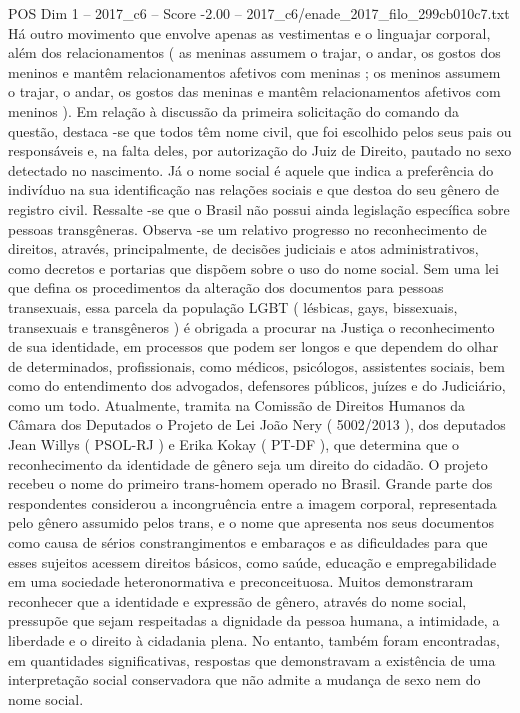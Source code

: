 \begin{textsample}{POS Dim 1 – 2017\_c6 – Score -2.00 – 2017\_c6/enade\_2017\_filo\_299cb010c7.txt}
Há outro movimento que envolve apenas as vestimentas e o linguajar corporal, além dos relacionamentos ( as meninas assumem o trajar, o andar, os gostos dos meninos e mantêm relacionamentos afetivos com meninas ; os meninos assumem o trajar, o andar, os gostos das meninas e mantêm relacionamentos afetivos com meninos ).
Em relação à discussão da primeira solicitação do comando da questão, destaca -se que todos têm nome civil, que foi escolhido pelos seus pais ou responsáveis e, na falta deles, por autorização do Juiz de Direito, pautado no sexo detectado no nascimento.
Já o nome social é aquele que indica a preferência do indivíduo na sua identificação nas relações sociais e que destoa do seu gênero de registro civil.
Ressalte -se que o Brasil não possui ainda legislação específica sobre pessoas transgêneras.
Observa -se um relativo progresso no reconhecimento de direitos, através, principalmente, de decisões judiciais e atos administrativos, como decretos e portarias que dispõem sobre o uso do nome social.
Sem uma lei que defina os procedimentos da alteração dos documentos para pessoas transexuais, essa parcela da população LGBT ( lésbicas, gays, bissexuais, transexuais e transgêneros ) é obrigada a procurar na Justiça o reconhecimento de sua identidade, em processos que podem ser longos e que dependem do olhar de determinados, profissionais, como médicos, psicólogos, assistentes sociais, bem como do entendimento dos advogados, defensores públicos, juízes e do Judiciário, como um todo.
Atualmente, tramita na Comissão de Direitos Humanos da Câmara dos Deputados o Projeto de Lei João Nery ( 5002/2013 ), dos deputados Jean Willys ( PSOL-RJ ) e Erika Kokay ( PT-DF ), que determina que o reconhecimento da identidade de gênero seja um direito do cidadão.
O projeto recebeu o nome do primeiro trans-homem operado no Brasil.
Grande parte dos respondentes considerou a incongruência entre a imagem corporal, representada pelo gênero assumido pelos trans, e o nome que apresenta nos seus documentos como causa de sérios constrangimentos e embaraços e as dificuldades para que esses sujeitos acessem direitos básicos, como saúde, educação e empregabilidade em uma sociedade heteronormativa e preconceituosa.
Muitos demonstraram reconhecer que a identidade e expressão de gênero, através do nome social, pressupõe que sejam respeitadas a dignidade da pessoa humana, a intimidade, a liberdade e o direito à cidadania plena.
No entanto, também foram encontradas, em quantidades significativas, respostas que demonstravam a existência de uma interpretação social conservadora que não admite a mudança de sexo nem do nome social.

\end{textsample}
